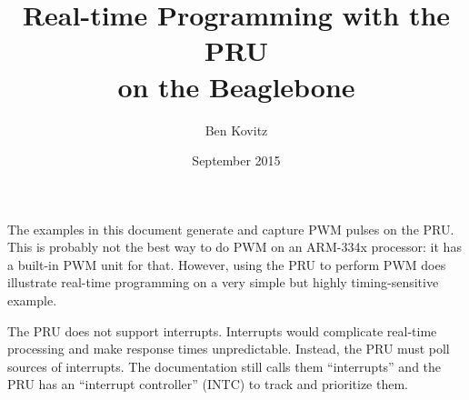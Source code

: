 \documentclass[letterpaper,11pt,fleqn]{article}
\title{Real-time Programming with the PRU \\ on the Beaglebone}
\author{Ben Kovitz}
\date{September 2015}
\begin{document}
\maketitle

The examples in this document generate and capture PWM pulses on the PRU.
This is probably not the best way to do PWM on an ARM-334x processor: it has a
built-in PWM unit for that. However, using the PRU to perform PWM does
illustrate real-time programming on a very simple but highly timing-sensitive
example.

The PRU does not support interrupts. Interrupts would complicate real-time
processing and make response times unpredictable. Instead, the PRU must poll
sources of interrupts. The documentation still calls them ``interrupts'' and 
the PRU has an ``interrupt controller'' (INTC) to track and prioritize them.
\end{document}
